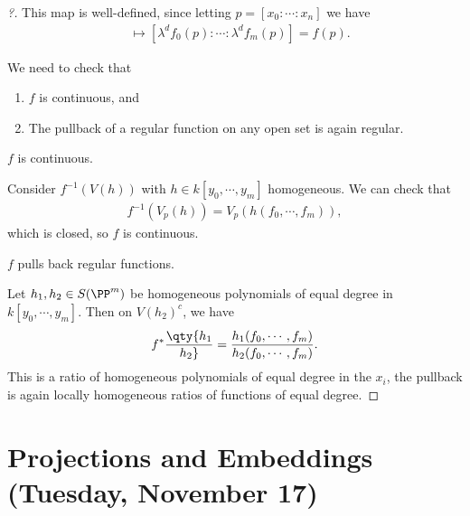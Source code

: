 \begin{proof}[?]

This map is well-defined, since letting \(p = [x_0: \cdots : x_n]\) we
have
\begin{align*}  
[\lambda x_0 : \cdots : \lambda x_n] 
&\mapsto 
[ \lambda^d f_0(p) : \cdots : \lambda^d f_m(p)] 
= f(p)
.\end{align*}

We need to check that

\begin{enumerate}
\def\labelenumi{\arabic{enumi}.}
\item
  \(f\) is continuous, and
\item
  The pullback of a regular function on any open set is again regular.
\end{enumerate}

\begin{claim}

\(f\) is continuous.

\end{claim}

Consider \(f^{-1}(V(h))\) with \(h\in k[y_0, \cdots, y_m]\) homogeneous.
We can check that
\begin{align*}  
f^{-1}(V_p(h)) = V_p(h(f_0, \cdots, f_m))
,\end{align*} which is closed, so \(f\) is continuous.

\begin{claim}

\(f\) pulls back regular functions.

\end{claim}

Let \(h_1, h_2 \in S(\PP^m)\) be homogeneous polynomials of equal degree
in \(k[y_0, \cdots, y_m]\). Then on \(V(h_2)^c\), we have
\begin{align*}  
f^*\qty{h_1 \over h_2 } = {h_1(f_0, \cdots, f_m) \over h_2(f_0, \cdots, f_m)}
.\end{align*} This is a ratio of homogeneous polynomials of equal degree
in the \(x_i\), the pullback is again locally homogeneous ratios of
functions of equal degree.

\end{proof}

\hypertarget{projections-and-embeddings-tuesday-november-17}{%
\section{Projections and Embeddings (Tuesday, November
17)}\label{projections-and-embeddings-tuesday-november-17}}

